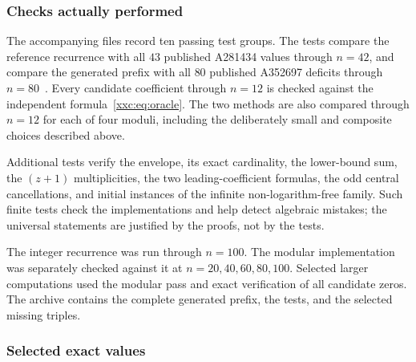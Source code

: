 \documentclass[11pt,a4paper]{article}
\numberwithin{equation}{section}
\theoremstyle{definition}
\theoremstyle{remark}
\theoremstyle{plain}
\begin{document}
\subsubsection{Checks actually performed}

The accompanying files record ten passing test groups. The tests compare the
reference recurrence with all $43$ published A281434 values through $n=42$,
and compare the generated prefix with all $80$ published A352697 deficits
through $n=80$~\cite{oeis281434,oeis352697}. Every candidate coefficient
through $n=12$ is checked against the independent formula~\eqref{xxc:eq:oracle}.
The two methods are also compared through $n=12$ for each of four moduli,
including the deliberately small and composite choices described above.

Additional tests verify the envelope, its exact cardinality, the lower-bound
sum, the $(z+1)$ multiplicities, the two leading-coefficient formulas,
the odd central cancellations, and initial instances of the infinite
non-logarithm-free family. Such finite tests check the implementations and
help detect algebraic mistakes; the universal statements are justified by
the proofs, not by the tests.

The integer recurrence was run through $n=100$. The modular implementation
was separately checked against it at $n=20,40,60,80,100$. Selected larger
computations used the modular pass and exact verification of all candidate
zeros. The archive contains the complete generated prefix, the tests, and
the selected missing triples.

\subsubsection{Selected exact values}
\end{document}
